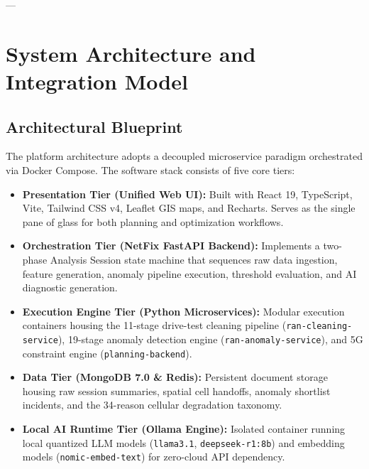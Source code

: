 \documentclass[12pt,a4paper]{report}
\begin{document}
---

\section{System Architecture and Integration Model}

\subsection{Architectural Blueprint}
The platform architecture adopts a decoupled microservice paradigm orchestrated via Docker Compose. The software stack consists of five core tiers:
\begin{itemize}
    \item \textbf{Presentation Tier (Unified Web UI):} Built with React 19, TypeScript, Vite, Tailwind CSS v4, Leaflet GIS maps, and Recharts. Serves as the single pane of glass for both planning and optimization workflows.
    \item \textbf{Orchestration Tier (NetFix FastAPI Backend):} Implements a two-phase Analysis Session state machine that sequences raw data ingestion, feature generation, anomaly pipeline execution, threshold evaluation, and AI diagnostic generation.
    \item \textbf{Execution Engine Tier (Python Microservices):} Modular execution containers housing the 11-stage drive-test cleaning pipeline (\texttt{ran-cleaning-service}), 19-stage anomaly detection engine (\texttt{ran-anomaly-service}), and 5G constraint engine (\texttt{planning-backend}).
    \item \textbf{Data Tier (MongoDB 7.0 \& Redis):} Persistent document storage housing raw session summaries, spatial cell handoffs, anomaly shortlist incidents, and the 34-reason cellular degradation taxonomy.
    \item \textbf{Local AI Runtime Tier (Ollama Engine):} Isolated container running local quantized LLM models (\texttt{llama3.1}, \texttt{deepseek-r1:8b}) and embedding models (\texttt{nomic-embed-text}) for zero-cloud API dependency.
\end{itemize}
\end{document}
